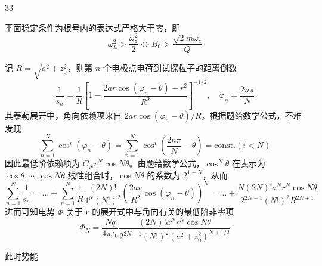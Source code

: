 \begin{solution}{33}
\begin{subsolution}
\begin{subsubsolution}
            平面稳定条件为根号内的表达式严格大于零，即
            \begin{equation}
                \omega_ {L} ^ {2} > \frac {\omega_ {z} ^ {2}}{2} \iff B _ {0} > \frac {\sqrt {2} m \omega_ {z}}{Q}
                \label{eq:12.s33}
            \end{equation}
        \end{subsubsolution}
        \begin{subsubsolution}
            记 $R = \sqrt{a^2 + z_0^2}$，则第 $n$ 个电极点电荷到试探粒子的距离倒数
            \begin{equation}
                \frac {1}{s _ {n}} = \frac {1}{R} \left[ 1 - \frac {2 a r \cos (\varphi_ {n} - \theta) - r ^ {2}}{R ^ {2}} \right] ^ {- 1 / 2}, \quad \varphi_ {n} = \frac {2 n \pi}{N}
                \label{eq:13.s33}
            \end{equation}
            其泰勒展开中，角向依赖项来自 $2ar\cos (\varphi_n - \theta) / R$。根据题给数学公式，不难发现
            \begin{equation}
                \sum_ {n = 1} ^ {N} \cos^ {i} (\varphi_ {n} - \theta) = \sum_ {n = 1} ^ {N} \cos^ {i} \left(\frac {2 n \pi}{N} - \theta\right) = \text {const.} (i <   N)
                \label{eq:14.s33}
            \end{equation}
            因此最低阶依赖项为 $C_{N}r^{N}\cos N\theta$。由题给数学公式，$\cos^{N}\theta$ 在表示为 $\cos\theta,\cdots,\cos N\theta$ 线性组合时，$\cos N\theta$ 的系数为 $2^{1-N}$，从而
            \begin{equation}
                \sum_ {n = 1} ^ {N} \frac {1}{s _ {n}} = \dots + \sum_ {n = 1} ^ {N} \frac {1}{R} \frac {(2 N) !}{4 ^ {N} (N !) ^ {2}} \left(\frac {2 a r}{R ^ {2}} \cos (\varphi_ {n} - \theta)\right) ^ {N} = \dots + \frac {N (2 N) ! a ^ {N} r ^ {N} \cos N \theta}{2 ^ {2 N - 1} (N !) ^ {2} R ^ {2 N + 1}}
                \label{eq:15.s33}
            \end{equation}
            进而可知电势 $\varPhi$ 关于 $r$ 的展开式中与角向有关的最低阶非零项
            \begin{equation}
                \varPhi_ {N} = \frac {N q}{4 \pi \varepsilon_ {0}} \frac {(2 N) ! a ^ {N} r ^ {N} \cos N \theta}{2 ^ {2 N - 1} (N !) ^ {2} (a ^ {2} + z _ {0} ^ {2}) ^ {N + 1 / 2}}
                \label{eq:16.s33}
            \end{equation}
        \end{subsubsolution}
        \begin{subsubsolution}
            此时势能

\end{subsubsolution}
\end{subsolution}
\end{solution}
